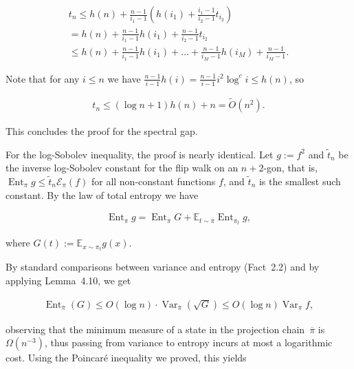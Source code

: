 \documentclass[10pt,a4paper]{article}
\begin{document}
\[\begin{gathered}
\displaystyle t_{n} \displaystyle\leq h(n)+\frac{n-1}{i_{1}-1}\left(h(i_{1})+\frac{i_{1}-1}{i_{2}-1}t_{i_{2}}\right) \\
\displaystyle=h(n)+\frac{n-1}{i_{1}-1}h(i_{1})+\frac{n-1}{i_{2}-1}t_{i_{2}} \\
\displaystyle\leq h(n)+\frac{n-1}{i_{1}-1}h(i_{1})+\dots+\frac{n-1}{i_{M}-1}h(i_{M})+\frac{n-1}{i_{M}-1}.
\end{gathered}\]


Note that for any $i\leq n$ we have $\frac{n-1}{i-1}h(i)=\frac{n-1}{i-1}i^{2}\log^{c}i\leq h(n)$, so\par


\[\begin{gathered}
t_{n}\leq(\log n+1)h(n)+n=\widetilde{O}(n^{2}).
\end{gathered}\]


This concludes the proof for the spectral gap.\par




For the log-Sobolev inequality, the proof is nearly identical. Let $g:=f^{2}$ and $\tilde{t}_{n}$ be the inverse log-Sobolev constant for the flip walk on an $n+2$-gon, that is, $\operatorname{Ent}_{\pi}g\leq\tilde{t}_{n}\mathcal{E}_{\pi}(f)$ for all non-constant functions $f$, and $\tilde{t}_{n}$ is the smallest such constant. By the law of total entropy we have\par


\[\begin{gathered}
\operatorname{Ent}_{\pi}g=\operatorname{Ent}_{\overline{\pi}}G+\mathbb{E}_{t\sim\overline{\pi}}\operatorname{Ent}_{\pi_{t}}g,
\end{gathered}\]


where $G(t):=\mathbb{E}_{x\sim\pi_{t}}g(x)$.\par




By standard comparisons between variance and entropy (Fact 2.2) and by applying Lemma 4.10, we get\par


\[\begin{gathered}
\operatorname{Ent}_{\bar{\pi}}(G)\leq O(\log n)\cdot\operatorname{Var}_{\bar{\pi}}(\sqrt{G})\leq O(\log n)\operatorname{Var}_{\pi}f,
\end{gathered}\]


observing that the minimum measure of a state in the projection chain $\overline{\pi}$ is $\Omega(n^{-3})$, thus passing from variance to entropy incurs at most a logarithmic cost. Using the Poincaré inequality we proved, this yields\par
\end{document}
